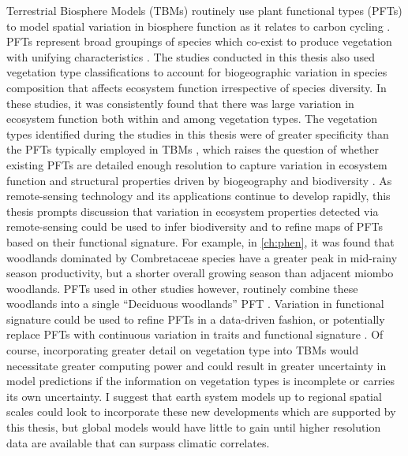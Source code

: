 \begin{refsection}
Terrestrial Biosphere Models (TBMs) routinely use plant functional types (PFTs) to model spatial variation in biosphere function as it relates to carbon cycling \citep{Fisher2014}. PFTs represent broad groupings of species which co-exist to produce vegetation with unifying characteristics \citep{Bonan2002}. The studies conducted in this thesis also used vegetation type classifications to account for biogeographic variation in species composition that affects ecosystem function irrespective of species diversity. In these studies, it was consistently found that there was large variation in ecosystem function both within and among vegetation types. The vegetation types identified during the studies in this thesis were of greater specificity than the PFTs typically employed in TBMs \citep{Ustin2010, Krinner2005}, which raises the question of whether existing PFTs are detailed enough resolution to capture variation in ecosystem function and structural properties driven by biogeography and biodiversity \citep{Osborne2018, Torello2013}. As remote-sensing technology and its applications continue to develop rapidly, this thesis prompts discussion that variation in ecosystem properties detected via remote-sensing could be used to infer biodiversity and to refine maps of PFTs based on their functional signature. For example, in \autoref{ch:phen}, it was found that woodlands dominated by Combretaceae species have a greater peak in mid-rainy season productivity, but a shorter overall growing season than adjacent miombo woodlands. PFTs used in other studies however, routinely combine these woodlands into a single ``Deciduous woodlands'' PFT \citep{Krinner2005}. Variation in functional signature could be used to refine PFTs in a data-driven fashion, or potentially replace PFTs with continuous variation in traits and functional signature \citep{Peaucelle2019}. Of course, incorporating greater detail on vegetation type into TBMs would necessitate greater computing power and could result in greater uncertainty in model predictions if the information on vegetation types is incomplete or carries its own uncertainty. I suggest that earth system models up to regional spatial scales could look to incorporate these new developments which are supported by this thesis, but global models would have little to gain until higher resolution data are available that can surpass climatic correlates.


\end{refsection}
